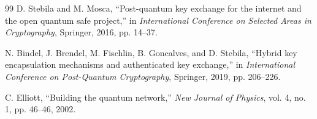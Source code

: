 \documentclass[11pt,a4paper]{article}
\theoremstyle{definition}
\theoremstyle{remark}
\begin{document}
\begin{thebibliography}{99}
D. Stebila and M. Mosca, ``Post-quantum key exchange for the internet and the open quantum safe project,'' in \emph{International Conference on Selected Areas in Cryptography}, Springer, 2016, pp. 14--37.

N. Bindel, J. Brendel, M. Fischlin, B. Goncalves, and D. Stebila, ``Hybrid key encapsulation mechanisms and authenticated key exchange,'' in \emph{International Conference on Post-Quantum Cryptography}, Springer, 2019, pp. 206--226.

C. Elliott, ``Building the quantum network,'' \emph{New Journal of Physics}, vol. 4, no. 1, pp. 46--46, 2002.

\end{thebibliography}
\end{document}
